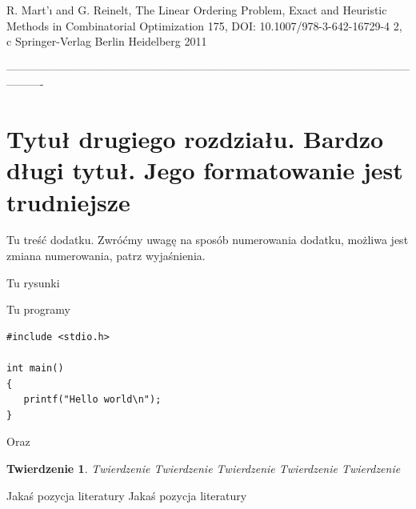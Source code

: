 \documentclass[twoside]{projektInzynierskiMS1}
\newtheorem{tw}{Twierdzenie}%
\begin{document}
R. Mart'ı and G. Reinelt, The Linear Ordering Problem, Exact and Heuristic Methods
in Combinatorial Optimization 175, DOI: 10.1007/978-3-642-16729-4 2,
c Springer-Verlag Berlin Heidelberg 2011


----------------------------------------------------------------------------------------------------------------------
\section[Tytuł drugiego rozdziału. Bardzo długi \ldots]
        {Tytuł drugiego rozdziału. \newlineTekst Bardzo długi tytuł. \newlineTekst
          Jego \newlineSpis formatowanie jest trudniejsze}




Tu treść dodatku. Zwróćmy uwagę na sposób numerowania dodatku, 
możliwa jest zmiana numerowania, patrz wyjaśnienia.
          

Tu rysunki


Tu programy

\begin{verbatim}
#include <stdio.h>

int main()
{
   printf("Hello world\n");
}
\end{verbatim}

\noindent
Oraz 

\bigskip

\vrule\hspace{10pt}\begin{minipage}{10cm}
\end{minipage}

\begin{tw}
Twierdzenie Twierdzenie Twierdzenie Twierdzenie Twierdzenie 
\end{tw}
\begin{thebibliography}{12}

 Jakaś pozycja literatury
 Jakaś pozycja literatury

\end{thebibliography}
\end{document}
